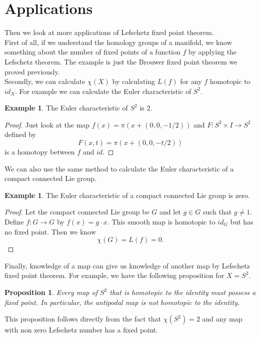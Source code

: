 \documentclass[psamsfonts]{amsart}
\newtheorem{prop}[theorem]{Proposition}
\theoremstyle{definition}
\newtheorem{exmp}[theorem]{Example}
\theoremstyle{remark}
\numberwithin{equation}{section}
\begin{document}
		\section{Applications}
		Then we look at more applications of Lefschetz fixed point theorem.\\
		\indent First of all, if we understand the homology groups of a manifold, we know something about the number of fixed points of a function $f$ by applying the Lefschetz theorem. The example is just the Brouwer fixed point theorem we proved previously.\\
		\indent Secondly, we can calculate $\chi (X)$ by calculating $L(f)$ for any $f$ homotopic to $id_X$. For example we can calculate the Euler characteristic of $S^2$.
		\begin{exmp}
			The Euler characteristic of $S^2$ is $2$.
		\end{exmp}
		\begin{proof}
			Just look at the map $f(x) = \pi (x + (0,0,-1/2))$ and $F: S^2 \times I \to S^2$ defined by
			\begin{equation}
				F(x,t) = \pi (x + (0,0,-t/2))
			\end{equation}
			is a homotopy between $f$ and $id$.
		\end{proof}
		We can also use the same method to calculate the Euler characteristic of a compact connected Lie group.
		\begin{exmp}
			The Euler characteristic of a compact connected Lie group is zero.
		\end{exmp}
		\begin{proof}
			Let the compact connected Lie group be $G$ and let $g \in G$ such that $g \neq 1$. Define $f: G \to G$ by $f(x) = g \cdot x$. This smooth map is homotopic to $id_G$ but has no fixed point. Then we know
			\begin{equation}
				\chi (G) = L(f) = 0.
			\end{equation}
		\end{proof}
		
		Finally, knowledge of a map can give us knowledge of another map by Lefschetz fixed point theorem. For example, we have the following proposition for $X = S^2$.
		\begin{prop}
			Every map of $S^2$ that is homotopic to the identity must possess a fixed point. In particular, the antipodal map is not homotopic to the identity.
		\end{prop}
		This proposition follows directly from the fact that $\chi (S^2) = 2$ and any map with non zero Lefschetz number has a fixed point.
		
\end{document}

